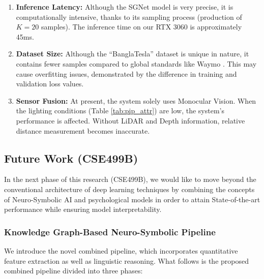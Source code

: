 \documentclass[12pt, a4paper]{article}
\begin{document}
\begin{enumerate}
    \item \textbf{Inference Latency:} Although the SGNet model is very precise, it is computationally intensive, thanks to its sampling process (production of $K = 20$ samples). The inference time on our RTX 3060 is approximately 45ms.
    \item \textbf{Dataset Size:} Although the ``BanglaTesla'' dataset is unique in nature, it contains fewer samples compared to global standards like Waymo \cite{sun2020scalability}. This may cause overfitting issues, demonstrated by the difference in training and validation loss values.
    \item \textbf{Sensor Fusion:} At present, the system solely uses Monocular Vision. When the lighting conditions (Table \ref{tab:pip_attr}) are low, the system’s performance is affected. Without LiDAR and Depth information, relative distance measurement becomes inaccurate.
\end{enumerate}

\subsection{Future Work (CSE499B)}
In the next phase of this research (CSE499B), we would like to move beyond the conventional architecture of deep learning techniques by combining the concepts of Neuro-Symbolic AI and psychological models in order to attain State-of-the-art performance while ensuring model interpretability.

\subsubsection{Knowledge Graph-Based Neuro-Symbolic Pipeline}


We introduce the novel combined pipeline, which incorporates quantitative feature extraction as well as linguistic reasoning. What follows is the proposed combined pipeline divided into three phases:
\end{document}

